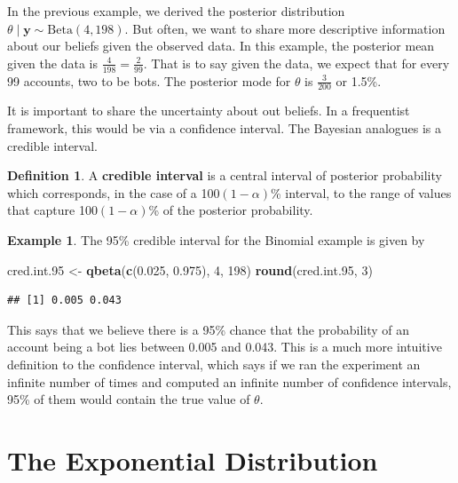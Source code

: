 \documentclass[
]{book}
\newenvironment{Shaded}{\begin{snugshade}}{\end{snugshade}}
\newcommand{\DecValTok}[1]{\textcolor[rgb]{0.00,0.00,0.81}{#1}}
\newcommand{\FloatTok}[1]{\textcolor[rgb]{0.00,0.00,0.81}{#1}}
\newcommand{\FunctionTok}[1]{\textcolor[rgb]{0.13,0.29,0.53}{\textbf{#1}}}
\newcommand{\NormalTok}[1]{#1}
\newcommand{\OtherTok}[1]{\textcolor[rgb]{0.56,0.35,0.01}{#1}}
\theoremstyle{definition}
\newtheorem{definition}{Definition}[chapter]
\theoremstyle{definition}
\newtheorem{example}{Example}[chapter]
\theoremstyle{definition}
\theoremstyle{definition}
\theoremstyle{remark}
\begin{document}
In the previous example, we derived the posterior distribution \(\theta \mid \boldsymbol{y} \sim \textrm{Beta}(4, 198)\). But often, we want to share more descriptive information about our beliefs given the observed data. In this example, the posterior mean given the data is \(\frac{4}{198} = \frac{2}{99}\). That is to say given the data, we expect that for every 99 accounts, two to be bots. The posterior mode for \(\theta\) is \(\frac{3}{200}\) or 1.5\%.

It is important to share the uncertainty about out beliefs. In a frequentist framework, this would be via a confidence interval. The Bayesian analogues is a credible interval.

\begin{definition}
A \textbf{credible interval} is a central interval of posterior probability which corresponds, in the case of a 100\((1-\alpha)\)\% interval, to the range of values that capture 100\((1-\alpha)\)\% of the posterior probability.
\end{definition}

\begin{example}
The 95\% credible interval for the Binomial example is given by

\begin{Shaded}
\begin{Highlighting}[]
\NormalTok{cred.int}\FloatTok{.95} \OtherTok{\textless{}{-}} \FunctionTok{qbeta}\NormalTok{(}\FunctionTok{c}\NormalTok{(}\FloatTok{0.025}\NormalTok{, }\FloatTok{0.975}\NormalTok{), }\DecValTok{4}\NormalTok{, }\DecValTok{198}\NormalTok{)}
\FunctionTok{round}\NormalTok{(cred.int}\FloatTok{.95}\NormalTok{, }\DecValTok{3}\NormalTok{)}
\end{Highlighting}
\end{Shaded}

\begin{verbatim}
## [1] 0.005 0.043
\end{verbatim}

This says that we believe there is a 95\% chance that the probability of an account being a bot lies between 0.005 and 0.043. This is a much more intuitive definition to the confidence interval, which says if we ran the experiment an infinite number of times and computed an infinite number of confidence intervals, 95\% of them would contain the true value of \(\theta\).
\end{example}

\hypertarget{the-exponential-distribution}{%
\section{The Exponential Distribution}\label{the-exponential-distribution}}
\end{document}
